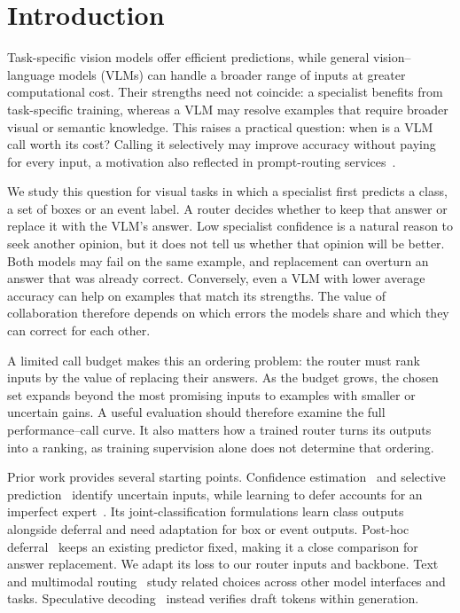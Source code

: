 \section{Introduction}
Task-specific vision models offer efficient predictions, while general vision--language models (VLMs) can handle a broader range of inputs at greater computational cost. Their strengths need not coincide: a specialist benefits from task-specific training, whereas a VLM may resolve examples that require broader visual or semantic knowledge. This raises a practical question: when is a VLM call worth its cost? Calling it selectively may improve accuracy without paying for every input, a motivation also reflected in prompt-routing services~\cite{bedrockrouting}.

We study this question for visual tasks in which a specialist first predicts a class, a set of boxes or an event label. A router decides whether to keep that answer or replace it with the VLM's answer. Low specialist confidence is a natural reason to seek another opinion, but it does not tell us whether that opinion will be better. Both models may fail on the same example, and replacement can overturn an answer that was already correct. Conversely, even a VLM with lower average accuracy can help on examples that match its strengths. The value of collaboration therefore depends on which errors the models share and which they can correct for each other.

A limited call budget makes this an ordering problem: the router must rank inputs by the value of replacing their answers. As the budget grows, the chosen set expands beyond the most promising inputs to examples with smaller or uncertain gains. A useful evaluation should therefore examine the full performance--call curve. It also matters how a trained router turns its outputs into a ranking, as training supervision alone does not determine that ordering.

Prior work provides several starting points. Confidence estimation~\cite{calibration} and selective prediction~\cite{selectivenet} identify uncertain inputs, while learning to defer accounts for an imperfect expert~\cite{defer,calibrateddefer}. Its joint-classification formulations learn class outputs alongside deferral and need adaptation for box or event outputs. Post-hoc deferral~\cite{posthocdefer} keeps an existing predictor fixed, making it a close comparison for answer replacement. We adapt its loss to our router inputs and backbone. Text and multimodal routing~\cite{frugal,routellm,cascaderouting,vlrouterbench,mmrbench,relope,streamsense} study related choices across other model interfaces and tasks. Speculative decoding~\cite{specdecode,specsampling} instead verifies draft tokens within generation.

